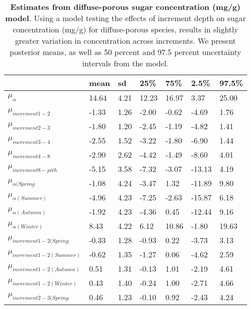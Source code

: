 \documentclass{article}\usepackage[]{graphicx}\usepackage[]{color}
\begin{document}
\begin{table}[ht]
\centering
\caption{\textbf{Estimates from diffuse-porous sugar concentration (mg/g) model}. Using a model testing the effects of increment depth on sugar concentration (mg/g) for diffuse-porous species, results in slightly greater variation in concentration across increments. We present posterior means, as well as 50 percent and 97.5 percent uncertainty intervals from the model.} 
\label{tab:diffsug}
\begingroup\footnotesize
\begin{tabular}{|p{}|p{}|p{}|p{}|p{}|p{}|p{}|}
  \hline
 & mean & sd & 25\% & 75\% & 2.5\% & 97.5\% \\ 
  \hline
$\mu_{\alpha}$ & 14.64 & 4.21 & 12.23 & 16.97 & 3.37 & 25.00 \\ 
  $\mu_{increment 1-2}$ & -1.33 & 1.26 & -2.00 & -0.62 & -4.69 & 1.76 \\ 
  $\mu_{increment 2-3}$ & -1.80 & 1.20 & -2.45 & -1.19 & -4.82 & 1.41 \\ 
  $\mu_{increment 3-4}$ & -2.55 & 1.52 & -3.22 & -1.80 & -6.90 & 1.44 \\ 
  $\mu_{increment 4-8}$ & -2.90 & 2.62 & -4.42 & -1.49 & -8.60 & 4.01 \\ 
  $\mu_{increment 8-pith}$ & -5.15 & 3.58 & -7.32 & -3.07 & -13.13 & 4.19 \\ 
  $\mu_{\alpha (Spring}$ & -1.08 & 4.24 & -3.47 & 1.32 & -11.89 & 9.80 \\ 
  $\mu_{\alpha (Summer)}$ & -4.96 & 4.23 & -7.25 & -2.63 & -15.87 & 6.18 \\ 
  $\mu_{\alpha (Autumn)}$ & -1.92 & 4.23 & -4.36 & 0.45 & -12.44 & 9.16 \\ 
  $\mu_{\alpha (Winter)}$ & 8.43 & 4.22 & 6.12 & 10.86 & -1.80 & 19.63 \\ 
  $\mu_{increment 1-2 (Spring}$ & -0.33 & 1.28 & -0.93 & 0.22 & -3.73 & 3.13 \\ 
  $\mu_{increment 1-2 (Summer)}$ & -0.62 & 1.35 & -1.27 & 0.06 & -4.62 & 2.59 \\ 
  $\mu_{increment 1-2 (Autumn)}$ & 0.51 & 1.31 & -0.13 & 1.01 & -2.19 & 4.61 \\ 
  $\mu_{increment 1-2 (Winter)}$ & 0.43 & 1.40 & -0.24 & 1.00 & -2.71 & 4.66 \\ 
  $\mu_{increment 2-3 (Spring}$ & 0.46 & 1.23 & -0.10 & 0.92 & -2.43 & 4.24 \\ 

\end{tabular}
\end{table}
\end{document}
